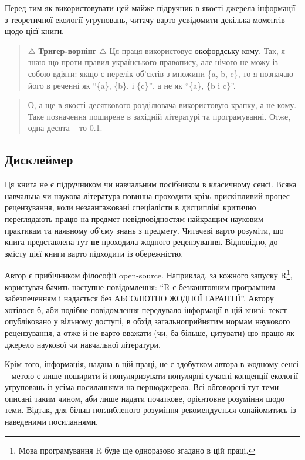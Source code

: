\documentclass[
  11pt,
]{book}
\begin{document}
Перед тим як використовувати цей майже підручник в якості джерела інформації з теоретичної екології угруповань, читачу варто усвідомити декілька моментів щодо цієї книги.

\begin{quote}
⚠️ \textbf{{Тригер-ворнінг}} ⚠️ Ця праця використовує \href{https://opentalk.org.ua/langstory/zaplutana-koma/}{оксфордську кому}. Так, я знаю що проти правил українського правопису, але нічого не можу із собою вдіяти: якщо є перелік об'єктів з множини \{a, b, c\}, то я позначаю його в реченні як ``\{a\}, \{b\}, і \{c\}'', а не як ``\{a\}, \{b i c\}''.
\end{quote}

\begin{quote}
О, а ще в якості десяткового розділювача використовую крапку, а не кому. Таке позначення поширене в західній літературі та програмуванні. Отже, одна десята -- то 0.1.
\end{quote}

\subsection{Дисклеймер}\label{readme}

Ця книга не є підручником чи навчальним посібником в класичному сенсі. Всяка навчальна чи наукова література повинна проходити крізь прискіпливий процес рецензування, коли незаангажовані спеціалісти в дисципліні критично переглядають працю на предмет невідповідностям найкращим науковим практикам та наявному об'єму знань з предмету. Читачеві варто розуміти, що книга представлена тут \textbf{не} проходила жодного рецензування. Відповідно, до змісту цієї книги варто підходити із обережністю.

Автор є прибічником філософії open-source. Наприклад, за кожного запуску R\footnote{Мова програмування R буде ще одноразово згадано в цій праці.}, користувач бачить наступне повідомлення: ``R є безкоштовним програмним забезпеченням і надається без АБСОЛЮТНО ЖОДНОЇ ГАРАНТІЇ''. Автору хотілося б, аби подібне повідомлення передувало інформації в цій книзі: текст опубліковано у вільному доступі, в обхід загальноприйнятим нормам наукового рецензування, а отже й не варто вважати (чи, ба більше, цитувати) цю працю як джерело наукової чи навчальної літератури.

Крім того, інформація, надана в цій праці, не є здобутком автора в жодному сенсі -- метою є лише поширити й популяризувати популярні сучасні концепції екології угруповань із усіма посиланнями на першоджерела. Всі обговорені тут теми описані таким чином, аби лише надати початкове, орієнтовне розуміння щодо теми. Відтак, для більш поглибленого розуміння рекомендується ознайомитись із наведеними посиланнями.
\end{document}
